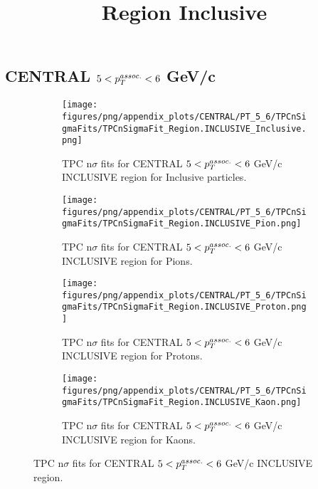     
            \subsection{CENTRAL $5 < \pTassoc < 6$ GeV/c}
            \begin{figure}[H]
                \title{Region Inclusive}
                \begin{subfigure}[b]{0.5\textwidth}
                    \centering
                    \texttt{[image: figures/png/appendix\_plots/CENTRAL/PT\_5\_6/TPCnSigmaFits/TPCnSigmaFit\_Region.INCLUSIVE\_Inclusive.png]}
                    \caption{TPC n$\sigma$ fits for CENTRAL $5 < \pTassoc < 6$ GeV/c INCLUSIVE region for Inclusive particles.}
                    \label{fig:appendix_CENTRAL_$5 < \pTassoc < 6$ GeV/c_INCLUSIVE_Inclusive}
                \end{subfigure}
                \begin{subfigure}[b]{0.5\textwidth}
                    \centering
                    \texttt{[image: figures/png/appendix\_plots/CENTRAL/PT\_5\_6/TPCnSigmaFits/TPCnSigmaFit\_Region.INCLUSIVE\_Pion.png]}
                    \caption{TPC n$\sigma$ fits for CENTRAL $5 < \pTassoc < 6$ GeV/c INCLUSIVE region for Pions.}
                    \label{fig:appendix_CENTRAL_$5 < \pTassoc < 6$ GeV/c_INCLUSIVE_Pion}
                \end{subfigure}
                \begin{subfigure}[b]{0.5\textwidth}
                    \centering
                    \texttt{[image: figures/png/appendix\_plots/CENTRAL/PT\_5\_6/TPCnSigmaFits/TPCnSigmaFit\_Region.INCLUSIVE\_Proton.png]}
                    \caption{TPC n$\sigma$ fits for CENTRAL $5 < \pTassoc < 6$ GeV/c INCLUSIVE region for Protons.}
                    \label{fig:appendix_CENTRAL_$5 < \pTassoc < 6$ GeV/c_INCLUSIVE_Proton}
                \end{subfigure}
                \begin{subfigure}[b]{0.5\textwidth}
                    \centering
                    \texttt{[image: figures/png/appendix\_plots/CENTRAL/PT\_5\_6/TPCnSigmaFits/TPCnSigmaFit\_Region.INCLUSIVE\_Kaon.png]}
                    \caption{TPC n$\sigma$ fits for CENTRAL $5 < \pTassoc < 6$ GeV/c INCLUSIVE region for Kaons.}
                    \label{fig:appendix_CENTRAL_$5 < \pTassoc < 6$ GeV/c_INCLUSIVE_Kaon}
                \end{subfigure}
                \caption{TPC n$\sigma$ fits for CENTRAL $5 < \pTassoc < 6$ GeV/c INCLUSIVE region.}
                \label{fig:appendix_CENTRAL_$5 < \pTassoc < 6$ GeV/c_INCLUSIVE}
            \end{figure}
